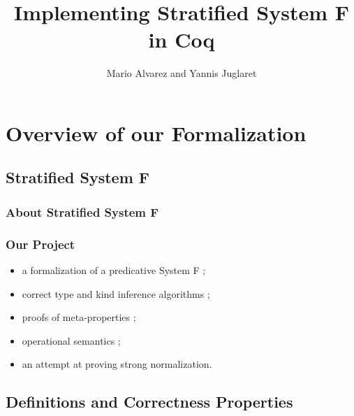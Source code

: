 \documentclass{beamer}
\title{Implementing Stratified System F in Coq}
\author{Mario Alvarez and Yannis Juglaret}
\date{\displaydate{date}}
\begin{document}
\begin{frame}
\titlepage
\end{frame}




\section{Overview of our Formalization}

\subsection{Stratified System F}

\begin{frame}
  \frametitle{About Stratified System F}

\end{frame}

\begin{frame}
  \frametitle{Our Project}

  \begin{itemize}
    \item a formalization of a predicative System F ;
    \item correct type and kind inference algorithms ;
    \item proofs of meta-properties ;
    \item operational semantics ;
    \item an attempt at proving strong normalization. 
  \end{itemize}

\end{frame}

\subsection{Definitions and Correctness Properties}
\end{document}
